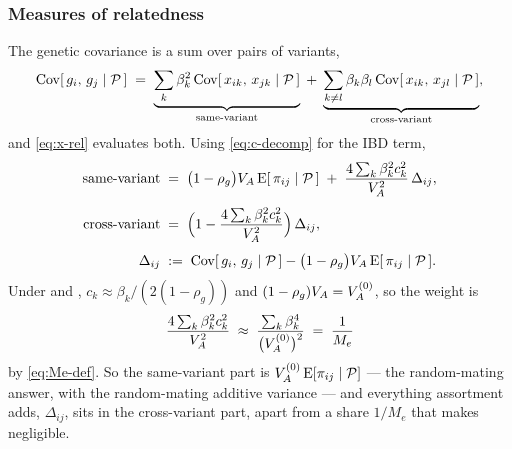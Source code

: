\documentclass[12pt]{article}
\begin{document}
\subsubsection{Measures of relatedness}\label{sec:am-relatedness-measures}
The genetic covariance is a sum over pairs of variants,
$$ \mathrm{Cov}[\,g_i,\, g_j \mid \mathcal{P}\,] \;=\; \underbrace{\sum_k \beta_k^2\, \mathrm{Cov}[\,x_{ik},\, x_{jk} \mid \mathcal{P}\,]}_{\text{same-variant}} \;+\; \underbrace{\sum_{k \neq l} \beta_k\beta_l\, \mathrm{Cov}[\,x_{ik},\, x_{jl} \mid \mathcal{P}\,]}_{\text{cross-variant}} , $$
and \eqref{eq:x-rel} evaluates both.
Using \eqref{eq:c-decomp} for the IBD term,
\begin{equation}\label{eq:same-cross}
\begin{aligned}
    \text{same-variant} \;&=\; \big(1-\rho_g\big)V_A\,\mathrm{E}[\,\pi_{ij} \mid \mathcal{P}\,] \;+\; \frac{4\sum_k \beta_k^2 c_k^2}{V_A^2}\,\Delta_{ij} , \\[4pt]
    \text{cross-variant} \;&=\; \Big(1 - \frac{4\sum_k \beta_k^2 c_k^2}{V_A^2}\Big)\,\Delta_{ij} , \\[4pt]
    \Delta_{ij} \;&:=\; \mathrm{Cov}[\,g_i,\, g_j \mid \mathcal{P}\,] - \big(1-\rho_g\big)V_A\,\mathrm{E}[\,\pi_{ij} \mid \mathcal{P}\,] .
\end{aligned}
\end{equation}
Under  and , $c_k \approx \beta_k/(2(1-\rho_g))$ and $(1-\rho_g)V_A = V_A^{(0)}$, so the weight is
$$ \frac{4\sum_k \beta_k^2 c_k^2}{V_A^2} \;\approx\; \frac{\sum_k \beta_k^4}{\big(V_A^{(0)}\big)^2} \;=\; \frac{1}{M_e} $$
by \eqref{eq:Me-def}.
So the same-variant part is $V_A^{(0)}\,\mathrm{E}[\pi_{ij}\mid\mathcal{P}]$ --- the random-mating answer, with the random-mating additive variance --- and everything assortment adds, $\Delta_{ij}$, sits in the cross-variant part, apart from a share $1/M_e$ that  makes negligible.
\end{document}
